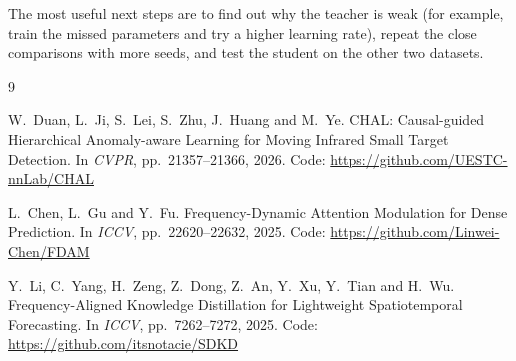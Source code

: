 \documentclass[11pt,a4paper]{article}
\begin{document}
The most useful next steps are to find out why the teacher is weak (for example, train the missed parameters and
try a higher learning rate), repeat the close comparisons with more seeds, and test the student on the other two
datasets.

\begin{thebibliography}{9}

W.~Duan, L.~Ji, S.~Lei, S.~Zhu, J.~Huang and M.~Ye.
CHAL: Causal-guided Hierarchical Anomaly-aware Learning for Moving Infrared Small Target Detection.
In \emph{CVPR}, pp.~21357--21366, 2026.
Code: \url{https://github.com/UESTC-nnLab/CHAL}

L.~Chen, L.~Gu and Y.~Fu.
Frequency-Dynamic Attention Modulation for Dense Prediction.
In \emph{ICCV}, pp.~22620--22632, 2025.
Code: \url{https://github.com/Linwei-Chen/FDAM}

Y.~Li, C.~Yang, H.~Zeng, Z.~Dong, Z.~An, Y.~Xu, Y.~Tian and H.~Wu.
Frequency-Aligned Knowledge Distillation for Lightweight Spatiotemporal Forecasting.
In \emph{ICCV}, pp.~7262--7272, 2025.
Code: \url{https://github.com/itsnotacie/SDKD}

\end{thebibliography}
\end{document}
